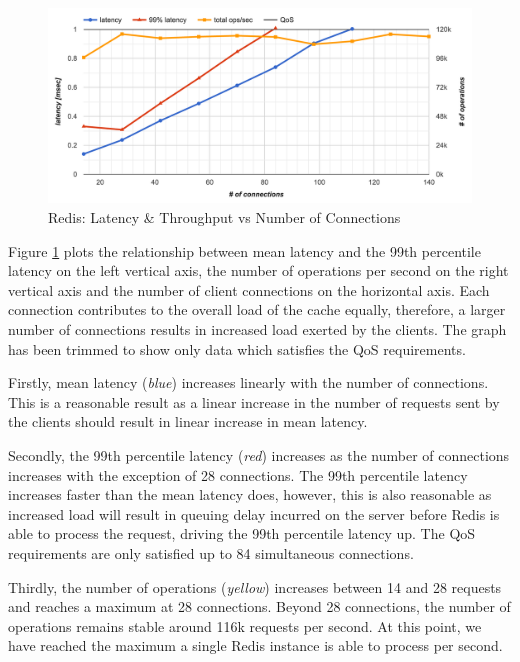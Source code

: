 \begin{figure}[h]
    \includegraphics[width=\textwidth]{./res2/r_baseline_latency.png}
    \caption{Redis: Latency \& Throughput vs Number of Connections}
    \label{fig:r_baseline_latency.png}
\end{figure}

Figure \ref{fig:r_baseline_latency.png} plots the relationship between mean latency and the 99th percentile latency on the left vertical axis, the number of operations per second on the right vertical axis and the number of client connections on the horizontal axis. Each connection contributes to the overall load of the cache equally, therefore, a larger number of connections results in increased load exerted by the clients. The graph has been trimmed to show only data which satisfies the QoS requirements.

Firstly, mean latency (\textit{blue}) increases linearly with the number of connections. This is a reasonable result as a linear increase in the number of requests sent by the clients should result in linear increase in mean latency.

Secondly, the 99th percentile latency (\textit{red}) increases as the number of connections increases with the exception of 28 connections. The 99th percentile latency increases faster than the mean latency does, however, this is also reasonable as increased load will result in queuing delay incurred on the server before Redis is able to process the request, driving the 99th percentile latency up. The QoS requirements are only satisfied up to 84 simultaneous connections.

Thirdly, the number of operations (\textit{yellow}) increases between 14 and 28 requests and reaches a maximum at 28 connections. Beyond 28 connections, the number of operations remains stable around 116k requests per second. At this point, we have reached the maximum a single Redis instance is able to process per second.







